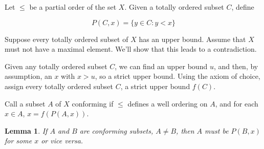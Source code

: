 \documentclass{article}
\newtheorem*{lemma}{Lemma}
\begin{document}
        Let $\leq$ be a partial order of the set $X$. Given a totally ordered
        subset $C$, define

        \[P(C,x) = \{y \in C: y < x\}\]

        Suppose every totally ordered subset of $X$ has an upper bound. Assume
        that $X$ must not have a maximal element. We'll show that this leads to
        a contradiction.

        Given any totally ordered subset $C$, we can find an upper bound $u$,
        and then, by assumption, an $x$ with $x>u$, so a strict upper bound.
        Using the axiom of choice, assign every totally ordered subset $C$, a
        strict upper bound $f(C)$.

        Call a subset $A$ of $X$ conforming if $\leq$ defines a well ordering on
        $A$, and for each $x \in A$, $x = f(P(A,x))$.

        \begin{lemma}
        If $A$ and $B$ are conforming subsets, $A \neq B$, then $A$ must
        be $P(B,x)$ for some $x$ or vice versa.
        \end{lemma}
\end{document}
